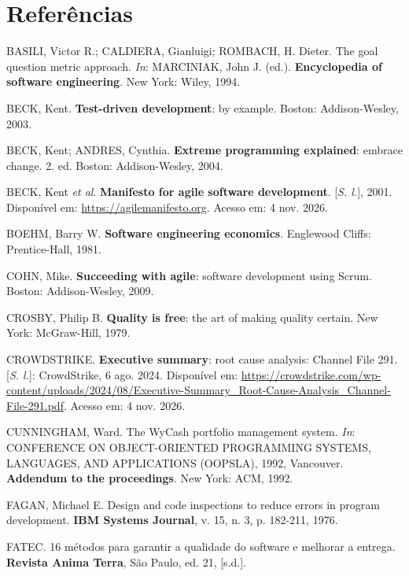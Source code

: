 \documentclass[12pt,a4paper]{article}
\begin{document}
\section*{Referências}

\begin{singlespace}
\setlength{\parindent}{0pt}
\setlength{\parskip}{10pt}
\raggedright

BASILI, Victor R.; CALDIERA, Gianluigi; ROMBACH, H. Dieter. The goal question metric approach. \textit{In}: MARCINIAK, John J. (ed.). \textbf{Encyclopedia of software engineering}. New York: Wiley, 1994.

BECK, Kent. \textbf{Test-driven development}: by example. Boston: Addison-Wesley, 2003.

BECK, Kent; ANDRES, Cynthia. \textbf{Extreme programming explained}: embrace change. 2. ed. Boston: Addison-Wesley, 2004.

BECK, Kent \textit{et al}. \textbf{Manifesto for agile software development}. [\textit{S. l.}], 2001. Disponível em: \url{https://agilemanifesto.org}. Acesso em: 4 nov. 2026.

BOEHM, Barry W. \textbf{Software engineering economics}. Englewood Cliffs: Prentice-Hall, 1981.

COHN, Mike. \textbf{Succeeding with agile}: software development using Scrum. Boston: Addison-Wesley, 2009.

CROSBY, Philip B. \textbf{Quality is free}: the art of making quality certain. New York: McGraw-Hill, 1979.

CROWDSTRIKE. \textbf{Executive summary}: root cause analysis: Channel File 291. [\textit{S. l.}]: CrowdStrike, 6 ago. 2024. Disponível em: \url{https://crowdstrike.com/wp-content/uploads/2024/08/Executive-Summary_Root-Cause-Analysis_Channel-File-291.pdf}. Acesso em: 4 nov. 2026.

CUNNINGHAM, Ward. The WyCash portfolio management system. \textit{In}: CONFERENCE ON OBJECT-ORIENTED PROGRAMMING SYSTEMS, LANGUAGES, AND APPLICATIONS (OOPSLA), 1992, Vancouver. \textbf{Addendum to the proceedings}. New York: ACM, 1992.

FAGAN, Michael E. Design and code inspections to reduce errors in program development. \textbf{IBM Systems Journal}, v. 15, n. 3, p. 182-211, 1976.

FATEC. 16 métodos para garantir a qualidade do software e melhorar a entrega. \textbf{Revista Anima Terra}, São Paulo, ed. 21, [s.d.].


\end{singlespace}
\end{document}

